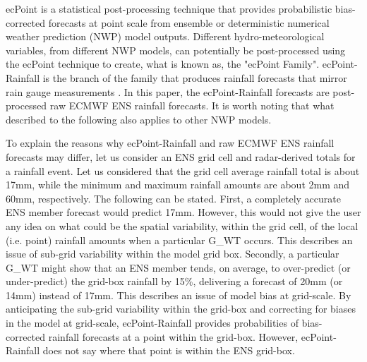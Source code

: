 \documentclass[twocol]{ametsocV5} %
\begin{document}
ecPoint is a statistical post-processing technique that provides probabilistic bias-corrected forecasts at point scale from ensemble or deterministic numerical weather prediction (NWP) model outputs. Different hydro-meteorological variables, from different NWP models, can potentially be post-processed using the ecPoint technique to create, what is known as, the "ecPoint Family". ecPoint-Rainfall is the branch of the family that produces rainfall forecasts that mirror rain gauge measurements \citep{Hewson2020a}. In this paper, the ecPoint-Rainfall forecasts are post-processed raw ECMWF ENS rainfall forecasts. It is worth noting that what described to the following also applies to other NWP models. \par
To explain the reasons why ecPoint-Rainfall and raw ECMWF ENS rainfall forecasts may differ, let us consider an ENS grid cell and radar-derived totals for a rainfall event. Let us considered that the grid cell average rainfall total is about 17mm, while the minimum and maximum rainfall amounts are about 2mm and 60mm, respectively. The following can be stated. First, a completely accurate ENS member forecast would predict 17mm. However, this would not give the user any idea on what could be the spatial variability, within the grid cell, of the local (i.e. point) rainfall amounts when a particular G\_WT occurs. This describes an issue of sub-grid variability within the model grid box. Secondly, a particular G\_WT might show that an ENS member tends, on average, to over-predict (or under-predict) the grid-box rainfall by 15\%, delivering a forecast of 20mm (or 14mm) instead of 17mm. This describes an issue of model bias at grid-scale. By anticipating the sub-grid variability within the grid-box and correcting for biases in the model at grid-scale, ecPoint-Rainfall provides probabilities of bias-corrected rainfall forecasts at a point within the grid-box. However, ecPoint-Rainfall does not say where that point is within the ENS grid-box. \par
\end{document}
